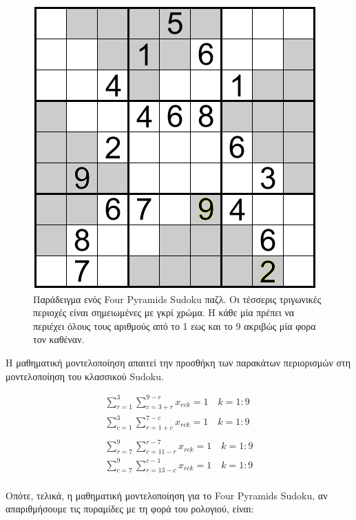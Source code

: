 \documentclass[oneside,12pt]{book}
\theoremstyle{definition}
\begin{document}
\begin{figure}[h]
	\centering
	\includegraphics[scale=0.7]{Figures/Pyramid Sudoku.png}
	\caption{Παράδειγμα ενός Four Pyramids Sudoku παζλ. Οι τέσσερις τριγωνικές περιοχές είναι σημειωμένες με γκρί χρώμα. Η κάθε μία πρέπει να περιέχει όλους τους αριθμούς από το 1 εως και το 9 ακριβώς μία φορα τον καθέναν.}
\end{figure}

Η μαθηματική μοντελοποίηση απαιτεί την προσθήκη των παρακάτων περιορισμών στη μοντελοποίηση του κλασσικού Sudoku.

\begin{align*}
	\sum_{r=1}^{3}{\sum_{c=3+r}^{9-r} x_{rck}} = 1 \quad k=1:9 \\
	\sum_{c=1}^{3}{\sum_{r=1+c}^{7-c} x_{rck}} = 1 \quad k=1:9 \\\\
	\sum_{r=7}^{9}{\sum_{c=11-r}^{r-7} x_{rck}} = 1 \quad k=1:9 \\
	\sum_{c=7}^{9}{\sum_{r=13-c}^{c-1} x_{rck}} = 1 \quad k=1:9 \\
\end{align*}

Οπότε, τελικά, η μαθηματική μοντελοποίηση για το Four Pyramids Sudoku, αν απαριθμήσουμε τις πυραμίδες με τη φορά του ρολογιού, είναι:
\end{document}
